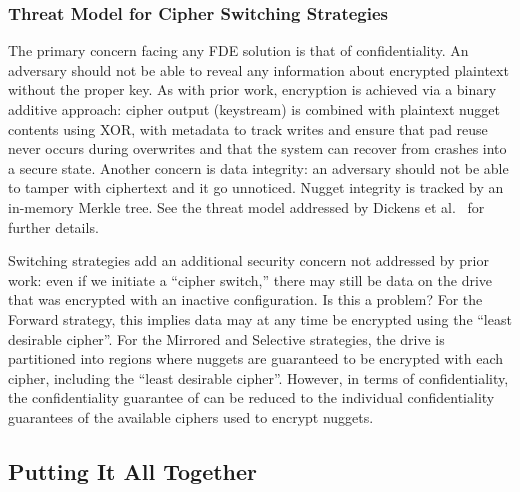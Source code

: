 \subsubsection{Threat Model for Cipher Switching Strategies}

The primary concern facing any FDE solution is that of confidentiality. An
adversary should not be able to reveal any information about encrypted plaintext
without the proper key. As with prior work, encryption is achieved via a binary
additive approach: cipher output (keystream) is combined with plaintext nugget
contents using XOR, with metadata to track writes and ensure that pad reuse
never occurs during overwrites and that the system can recover from crashes into
a secure state. Another concern is data integrity: an adversary should not be
able to tamper with ciphertext and it go unnoticed. Nugget integrity is tracked
by an in-memory Merkle tree. See the threat model addressed by Dickens et
al.~\cite{StrongBox} for further details.

Switching strategies add an additional security concern not addressed by prior
work: even if we initiate a ``cipher switch,'' there may still be data on the
drive that was encrypted with an inactive configuration. Is this a problem? For
the Forward strategy, this implies data may at any time be encrypted using the
``least desirable cipher''. For the Mirrored and Selective strategies, the drive
is partitioned into regions where nuggets are guaranteed to be encrypted with
each cipher, including the ``least desirable cipher''. However, in terms of
confidentiality, the confidentiality guarantee of \sys{} can be reduced to
the individual confidentiality guarantees of the available ciphers used to
encrypt nuggets.

\subsection{Putting It All Together} \label{subsec:summary}

